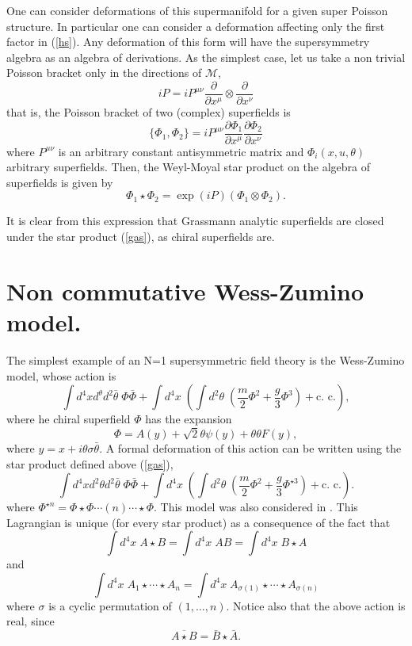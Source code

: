 \documentclass[a4paper,12pt]{article}
\begin{document}
One can consider deformations of this supermanifold for a given super 
Poisson structure. In particular one can 
consider a deformation affecting only  the first factor in (\ref{hs}). 
Any deformation of this form will have the supersymmetry algebra as an 
algebra of derivations. As 
the simplest case, let us take a non trivial Poisson bracket only in the
 directions of $\mathcal{M}$,
$$iP=iP^{\mu \nu}\frac{\partial}{ \partial x^\mu}\otimes\frac{\partial}{
\partial x^\nu}
$$
that is, the Poisson bracket of two (complex) superfields is
$$
\{\Phi_1,\Phi_2\}=iP^{\mu \nu}\frac{\partial\Phi_1}{\partial x^\mu}
\frac{\partial\Phi_2}{\partial x^\nu}
$$
where $P^{\mu\nu}$ is an arbitrary constant antisymmetric matrix and 
$\Phi_i(x,u,\theta)$ arbitrary superfields. Then, the 
Weyl-Moyal  star product on the algebra of superfields is given  by
\begin{equation}
\Phi_1\star\Phi_2= \exp(iP)(\Phi_1\otimes\Phi_2).
\label{gas}\end{equation}



It is clear from this expression that Grassmann analytic superfields are
 closed under the star product (\ref{gas}), as chiral superfields are.


\section{Non commutative Wess-Zumino model.}

The simplest example of an   N=1  supersymmetric 
field theory is the Wess-Zumino model, whose action is
$$
\int d^4xd^\theta d^2\bar\theta\;  \Phi\bar\Phi+\int d^4x\;(\int
d^2\theta\; (\frac{m}{ 2}\Phi^2 +
\frac{g}{ 3}\Phi^3) +\mbox{c. c.}),
$$ 
where he chiral superfield $\Phi$ has the expansion
$$
\Phi=A(y)+\sqrt{2}\theta\psi(y) +\theta\theta F(y),
$$
where $y=x+i\theta\sigma\bar\theta$.
A formal deformation of this action can be written using the star product 
defined above (\ref{gas}),
\begin{equation}
\int d^4xd^2\theta d^2\bar\theta\; \Phi\bar\Phi+\int d^4x\;(\int d^2\theta
\;(\frac{m}{2}\Phi^2 +
\frac{g}{3}\Phi^{\star 3}) +\mbox{c. c.}).
\label{incw}
\end{equation} 
where $\Phi^{\star n}=\Phi\star\Phi\cdots(n)\cdots\star\Phi$. This model
was also considered in \cite{cr, gp}.
This Lagrangian is unique  (for every star product)
 as a consequence of the fact that
\begin{equation}
\int d^4x\;A\star B=\int d^4x\;A B=\int d^4x\;B\star A
\label{ip1}
\end{equation} 
and
\begin{equation}
\int d^4x\;A_1\star\cdots \star  A_n=\int d^4x\;A_{\sigma(1)}\star\cdots
\star A_{\sigma(n)}
\label{ip2}
\end{equation}
where $\sigma$ is a cyclic permutation of $(1,\dots, n)$.
Notice also that the above action is real, since
$$
\overline{A\star B} =\bar B\star \bar A.
$$
\end{document}
